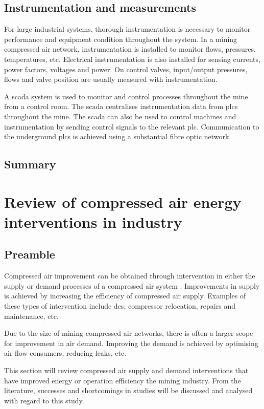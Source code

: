 \subsection{Instrumentation and measurements}
For large industrial systems, thorough instrumentation is necessary to monitor performance and equipment condition throughout the system. In a mining compressed air network, instrumentation is installed to monitor flows, pressures, temperatures, etc. Electrical instrumentation is also installed for sensing currents, power factors, voltages and power. On control valves, input/output pressures, flows and valve position are usually measured with instrumentation.	
\par
A \gls{scada} system is used to monitor and control processes throughout the mine from a control room. The \gls{scada} centralises instrumentation data from \glspl{plc} throughout the mine. The \gls{scada} can also be used to control machines and instrumentation by sending control signals to the relevant \gls{plc}.  Communication to the underground \glspl{plc} is achieved using a substantial fibre optic network.\cite{schroeder2009energy}
\subsection{Summary}
\clearpage
\section{Review of compressed air energy interventions in industry}
	\subsection{Preamble}
		Compressed air improvement can be obtained through intervention in either the supply or demand processes of a compressed air system \cite{Kriel2014Masters}. Improvements in supply is achieved by increasing the efficiency of compressed air supply. Examples of these types of intervention include \gls{dcs}, compressor relocation, repairs and maintenance, etc. 
		\par
		Due to the size of mining compressed air networks, there is often a larger scope for improvement in air demand. Improving the demand is achieved by optimising air flow consumers, reducing leaks, etc.
		\par
	 	 This section will review compressed air supply and demand interventions that have improved energy or operation efficiency the mining industry. From the literature, successes and shortcomings in studies will be discussed and analysed with regard to this study.
	 	

